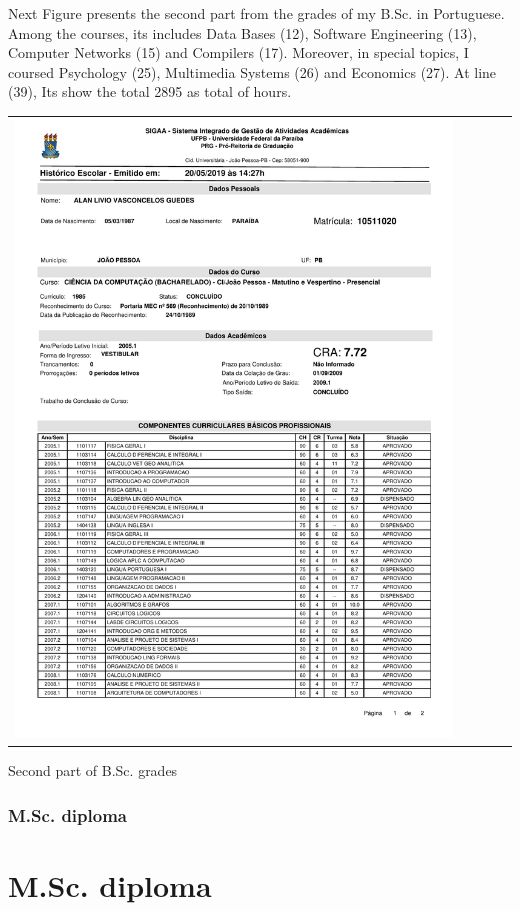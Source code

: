 \documentclass[10pt,a4paper,sans,colorlinks]{moderncv}
\begin{document}
Next Figure presents the second part from the grades of my B.Sc. in Portuguese.
Among the courses, its includes Data Bases (12), Software Engineering (13), Computer Networks (15) and Compilers (17).
Moreover, in special topics, I coursed Psychology (25), Multimedia Systems (26) and Economics (27).
At line (39), Its show the total 2895 as total of hours.
\vspace{2em}
\begin{Figure}
  \begin{tabularx}{\textwidth}{X p{1cm}}
    \includegraphics[align=t,width=0.92\textwidth, keepaspectratio,page=2, trim=0cm 0cm 0cm 2cm]{certificates/bsc-grades.pdf}
  \end{tabularx}
  \caption{Second part of B.Sc. grades}
\end{Figure}

\newpage

\section{M.Sc. diploma}\part{M.Sc. diploma}
\end{document}
